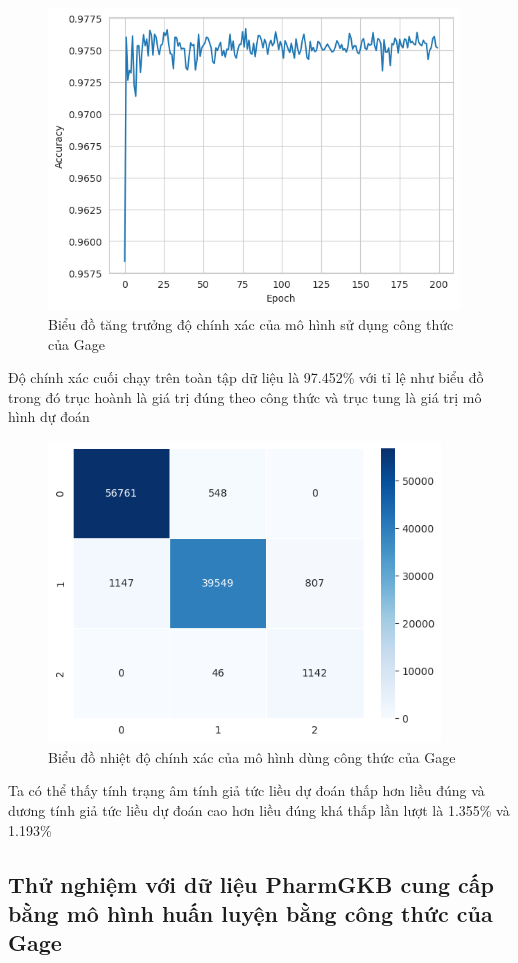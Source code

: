\documentclass[14pt,oneside]{scrbook}
\begin{document}
\begin{figure}
\centering
\includegraphics[width=\textwidth,height=8cm]{image/gage_accu.png}
\caption{Biểu đồ tăng trưởng độ chính xác của mô hình sử dụng công thức
của Gage}
\end{figure}

Độ chính xác cuối chạy trên toàn tập dữ liệu là 97.452\% với tỉ lệ như
biểu đồ trong đó trục hoành là giá trị đúng theo công thức và trục tung
là giá trị mô hình dự đoán

\begin{figure}
\centering
\includegraphics[width=\textwidth,height=8cm]{image/gage_heatmap.png}
\caption{Biểu đồ nhiệt độ chính xác của mô hình dùng công thức của Gage}
\end{figure}

Ta có thể thấy tính trạng âm tính giả tức liều dự đoán thấp hơn liều
đúng và dương tính giả tức liều dự đoán cao hơn liều đúng khá thấp lần
lượt là 1.355\% và 1.193\%

\subsection{Thử nghiệm với dữ liệu PharmGKB cung cấp bằng mô hình huấn
luyện bằng công thức của
Gage}\label{thux1eed-nghiux1ec7m-vux1edbi-dux1eef-liux1ec7u-pharmgkb-cung-cux1ea5p-bux1eb1ng-muxf4-huxecnh-huux1ea5n-luyux1ec7n-bux1eb1ng-cuxf4ng-thux1ee9c-cux1ee7a-gage}
\end{document}
